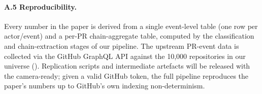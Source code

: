 \paragraph{A.5 Reproducibility.}
Every number in the paper is derived from a single event-level table (one row per actor/event) and a per-PR chain-aggregate table, computed by the classification and chain-extraction stages of our pipeline. The upstream PR-event data is collected via the GitHub GraphQL API against the 10,000{} repositories in our universe (). Replication scripts and intermediate artefacts will be released with the camera-ready; given a valid GitHub token, the full pipeline reproduces the paper's numbers up to GitHub's own indexing non-determinism.
